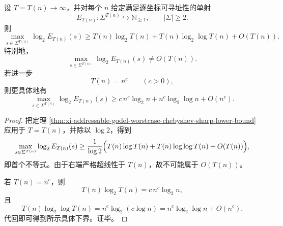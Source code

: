 \begin{corollary}\label{cor:xi-addressable-witness-no-asymptotically-linear-bitlength}
设 \(T=T(n)\to\infty\)，并对每个 \(n\) 给定满足逐坐标可寻址性的单射
\[
E_{T(n)}:\Sigma^{T(n)}\hookrightarrow \mathbb N_{\ge 1},
\qquad
|\Sigma|\ge 2.
\]
则
\[
\max_{s\in\Sigma^{T(n)}}\log_2 E_{T(n)}(s)
\ge
T(n)\log_2 T(n)+T(n)\log_2\log T(n)+O(T(n)).
\]
特别地，
\[
\max_{s\in\Sigma^{T(n)}}\log_2 E_{T(n)}(s)\neq O(T(n)).
\]
若进一步
\[
T(n)=n^c
\qquad (c>0),
\]
则更具体地有
\[
\max_{s\in\Sigma^{T(n)}}\log_2 E_{T(n)}(s)
\ge
c\,n^c\log_2 n+n^c\log_2\log n+O(n^c).
\]
\end{corollary}
\begin{proof}
把定理 \ref{thm:xi-addressable-godel-worstcase-chebyshev-sharp-lower-bound} 应用于 \(T=T(n)\)，并除以 \(\log 2\)，得到
\[
\max_{s\in\Sigma^{T(n)}}\log_2 E_{T(n)}(s)
\ge
\frac{1}{\log 2}
\Bigl(
T(n)\log T(n)+T(n)\log\log T(n)+O(T(n))
\Bigr),
\]
即首个不等式。由于右端严格超线性于 \(T(n)\)，故不可能属于 \(O(T(n))\)。

若 \(T(n)=n^c\)，则
\[
T(n)\log_2 T(n)=c\,n^c\log_2 n,
\]
且
\[
T(n)\log_2\log T(n)
=
n^c\log_2(c\log n)
=
n^c\log_2\log n+O(n^c).
\]
代回即可得到所示具体下界。证毕。
\end{proof}

